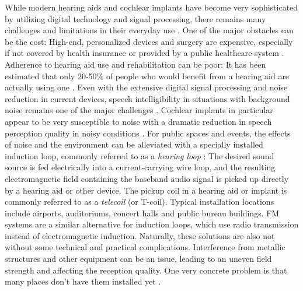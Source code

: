 \documentclass[english, 12pt, a4paper, pdftex, elec, utf8]{aaltothesis}
\begin{document}
While modern hearing aids and cochlear implants have become very sophisticated by utilizing digital technology and signal processing, there remains many challenges and limitations in their everyday use \cite{levitt2007historical}. One of the major obstacles can be the cost: High-end, personalized devices and surgery are expensive, especially if not covered by health insurance or provided by a public healthcare system \cite{wilson2017global}. Adherence to hearing aid use and rehabilitation can be poor: It has been estimated that only 20-50\% of people who would benefit from a hearing aid are actually using one \cite{koskela2013kuulokojeen}. Even with the extensive digital signal processing and noise reduction in current devices, speech intelligibility in situations with background noise remains one of the major challenges \cite{healy2016difficulty, levitt2007historical, goehring2016speech}. Cochlear implants in particular appear to be very susceptible to noise with a dramatic reduction in speech perception quality in noisy conditions \cite{ healy2016difficulty, friesen2001speech, fu2005noise, srinivasan2013improving}. For public spaces and events, the effects of noise and the environment can be alleviated with a specially installed induction loop, commonly referred to as a \textit{hearing loop} \cite{salonen2013hearing}: The desired sound source is fed electrically into a current-carrying wire loop, and the resulting electromagnetic field containing the baseband audio signal is picked up directly by a hearing aid or other device. The pickup coil in a hearing aid or implant is commonly referred to as a \textit{telecoil} (or T-coil). Typical installation locations include airports, auditoriums, concert halls and public bureau buildings. FM systems are a similar alternative for induction loops, which use radio transmission instead of electromagnetic induction. Naturally, these solutions are also not without some technical and practical complications. Interference from metallic structures and other equipment can be an issue, leading to an uneven field strength and affecting the reception quality. One very concrete problem is that many places don't have them installed yet \cite{healy2016difficulty, wilson2017global}. \\\\
\end{document}
